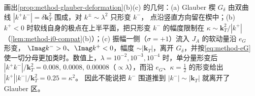 
\begin{remark}[一个分量的形变为何不够]\label{rem:method-two-component}
画出\cref{prop:method-glauber-deformation}(b)(c) 的几何：(a) Glauber 楔 $G_\delta$ 由双曲线 $|k^+k^-|=\delta\mathbf k_T^2$ 围成，对 $k^\pm\sim\lambda^2$ 只形变 $k^-$，
点沿竖直方向留在楔中；(b) $k^+<0$ 时软线自身的极点在上半平面，把只形变 $k^-$ 的幅度限制在 $\kappa\sim\mathbf k_T^2/|k^+|$（\cref{lem:method-i0-compat}(b)）；(c) 振幅一侧（$\sigma=+1$）流入 $J_A$ 的软动量沿 $e_G$ 形变，
$\Imag k^->0$、$\Imag k^+<0$，幅度 $\sim|\mathbf k_T|$，离开 $G_\delta$，并按\cref{eq:method-eG}使一切分母更加类时。数值上，$\lambda=10^{-2},10^{-3},10^{-4}$ 时，单分量形变后
$|k^+k^-|/\mathbf k_T^2=0.008,\,0.0008,\,0.00008$（$\propto\lambda$），而沿 $e_G$、$\kappa=\frac12$ 的形变给出 $|k^+||k^-|/\mathbf k_T^2=0.25=\kappa^2$。%
因此不能说把 $k^-$ 围道推到 $|k^-|\sim|\mathbf k_T|$ 就离开了 Glauber 区。
\end{remark}

